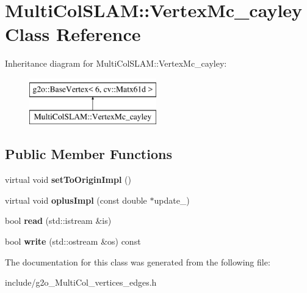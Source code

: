 \hypertarget{classMultiColSLAM_1_1VertexMc__cayley}{}\section{Multi\+Col\+S\+L\+AM\+:\+:Vertex\+Mc\+\_\+cayley Class Reference}
\label{classMultiColSLAM_1_1VertexMc__cayley}
Inheritance diagram for Multi\+Col\+S\+L\+AM\+:\+:Vertex\+Mc\+\_\+cayley\+:\begin{figure}[H]
\begin{center}
\leavevmode
\includegraphics[height=2.000000cm]{classMultiColSLAM_1_1VertexMc__cayley}
\end{center}
\end{figure}
\subsection*{Public Member Functions}
\begin{DoxyCompactItemize}
\item 
virtual void {\bfseries set\+To\+Origin\+Impl} ()\hypertarget{classMultiColSLAM_1_1VertexMc__cayley_a3f176c92601fda3bed3fc9d6e586d9eb}{}\label{classMultiColSLAM_1_1VertexMc__cayley_a3f176c92601fda3bed3fc9d6e586d9eb}

\item 
virtual void {\bfseries oplus\+Impl} (const double $\ast$update\+\_\+)\hypertarget{classMultiColSLAM_1_1VertexMc__cayley_a897371c61e666db70c1d761d602efc6b}{}\label{classMultiColSLAM_1_1VertexMc__cayley_a897371c61e666db70c1d761d602efc6b}

\item 
bool {\bfseries read} (std\+::istream \&is)\hypertarget{classMultiColSLAM_1_1VertexMc__cayley_a9d3aca703f92f2728de5819872e5511d}{}\label{classMultiColSLAM_1_1VertexMc__cayley_a9d3aca703f92f2728de5819872e5511d}

\item 
bool {\bfseries write} (std\+::ostream \&os) const \hypertarget{classMultiColSLAM_1_1VertexMc__cayley_af24876878d2999276631d931cdeeb100}{}\label{classMultiColSLAM_1_1VertexMc__cayley_af24876878d2999276631d931cdeeb100}

\end{DoxyCompactItemize}


The documentation for this class was generated from the following file\+:\begin{DoxyCompactItemize}
\item 
include/g2o\+\_\+\+Multi\+Col\+\_\+vertices\+\_\+edges.\+h\end{DoxyCompactItemize}
